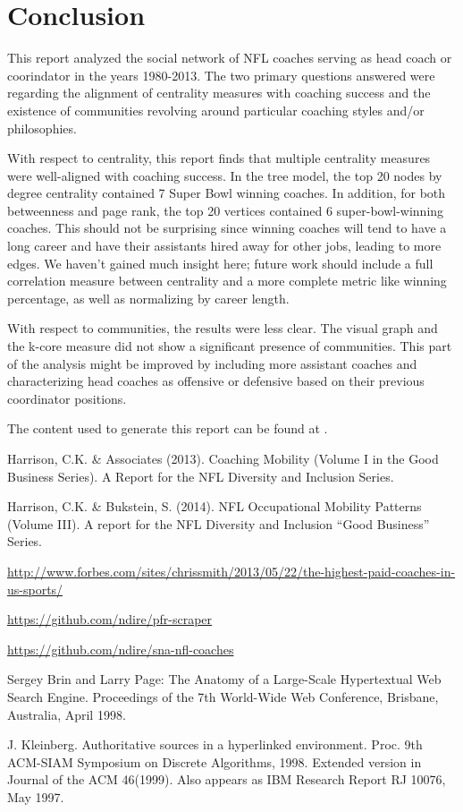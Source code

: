 \documentclass[11pt]{article}\usepackage[]{graphicx}\usepackage[]{color}
\begin{document}
\section{Conclusion}

This report analyzed the social network of NFL coaches serving as head coach or
coorindator in the years 1980-2013.  The two primary questions answered were
regarding the alignment of centrality measures with coaching success and the
existence of communities revolving around particular coaching styles and/or
philosophies.

With respect to centrality, this report finds that multiple centrality measures
were well-aligned with coaching success.  In the tree model, the top 20 nodes
by degree centrality contained 7 Super Bowl winning coaches.  In addition, for
both betweenness and page rank, the top 20 vertices contained 6
super-bowl-winning coaches.  This should not be surprising since winning
coaches will tend to have a long career and have their assistants hired away
for other jobs, leading to more edges.  We haven't gained much insight here;
future work should include a full correlation measure between centrality and a
more complete metric like winning percentage, as well as normalizing by career
length.

With respect to communities, the results were less clear.  The visual graph and
the k-core measure did not show a significant presence of communities.  This
part of the analysis might be improved by including more assistant coaches and
characterizing head coaches as offensive or defensive based on their previous
coordinator positions.

The content used to generate this report can be found at \cite{project}.

\begin{thebibliography}{99}

 Harrison, C.K. \& Associates (2013). Coaching Mobility (Volume I in the Good Business Series). A Report for the NFL Diversity and Inclusion Series.

 Harrison, C.K. \& Bukstein, S. (2014). NFL Occupational Mobility Patterns (Volume III). A report for the NFL Diversity and Inclusion “Good Business” Series.

  \url{http://www.forbes.com/sites/chrissmith/2013/05/22/the-highest-paid-coaches-in-us-sports/}

 \url{https://github.com/ndire/pfr-scraper}

 \url{https://github.com/ndire/sna-nfl-coaches}

 Sergey Brin and Larry Page: The Anatomy of a Large-Scale Hypertextual Web Search Engine. Proceedings of the 7th World-Wide Web Conference, Brisbane, Australia, April 1998.

 J. Kleinberg. Authoritative sources in a hyperlinked environment. Proc. 9th ACM-SIAM Symposium on Discrete Algorithms, 1998. Extended version in Journal of the ACM 46(1999). Also appears as IBM Research Report RJ 10076, May 1997.

\end{thebibliography}
\end{document}
